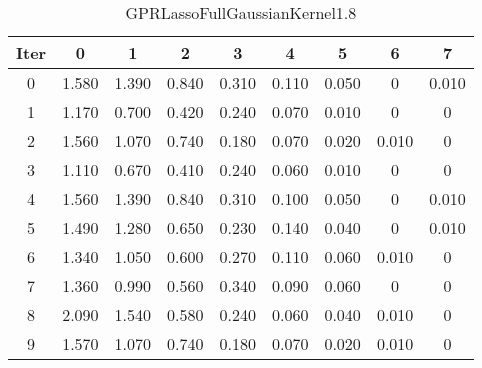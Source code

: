 \begin{table}
	\begin{center}
		\begin{tabular}{|c|c|c|c|c|c|c|c|c|}
			\hline
			Iter & 0 & 1 & 2 & 3 & 4 & 5 & 6 & 7 \\
			\hline
			0 & 1.580 & 1.390 & 0.840 & 0.310 & 0.110 & 0.050 & 0 & 0.010 \\
			\hline
			1 & 1.170 & 0.700 & 0.420 & 0.240 & 0.070 & 0.010 & 0 & 0 \\
			\hline
			2 & 1.560 & 1.070 & 0.740 & 0.180 & 0.070 & 0.020 & 0.010 & 0 \\
			\hline
			3 & 1.110 & 0.670 & 0.410 & 0.240 & 0.060 & 0.010 & 0 & 0 \\
			\hline
			4 & 1.560 & 1.390 & 0.840 & 0.310 & 0.100 & 0.050 & 0 & 0.010 \\
			\hline
			5 & 1.490 & 1.280 & 0.650 & 0.230 & 0.140 & 0.040 & 0 & 0.010 \\
			\hline
			6 & 1.340 & 1.050 & 0.600 & 0.270 & 0.110 & 0.060 & 0.010 & 0 \\
			\hline
			7 & 1.360 & 0.990 & 0.560 & 0.340 & 0.090 & 0.060 & 0 & 0 \\
			\hline
			8 & 2.090 & 1.540 & 0.580 & 0.240 & 0.060 & 0.040 & 0.010 & 0 \\
			\hline
			9 & 1.570 & 1.070 & 0.740 & 0.180 & 0.070 & 0.020 & 0.010 & 0 \\
			\hline
		\end{tabular}
	\end{center}
	\caption{GPRLassoFullGaussianKernel1.8}
\end{table}